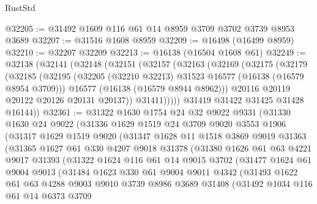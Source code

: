 \begin{lexlean}{RustStd}
\begin{coremodule}
@32205 := @31492 @1609 @116 @61 @14 @8959 @3709 @3702 @3739 @8953 @3689
@32207 := @31516 @1608 @8959
@32209 := @16498 (@16499 @8959)
@32210 := @32207 @32209
@32213 := @16138 (@16504 @1608 @61)
@32249 := @32138
    (@32141
      (@32148
        (@32151
          (@32157
            (@32163
              (@32169
                (@32175
                  (@32179
                    (@32185
                      (@32195
                        (@32205 (@32210 @32213) @31523 @16577 (@16138 (@16579 @8954 @3709)))
                        @16577
                        (@16138 (@16579 @8944 @8962)))
                      @20116
                      @20119
                      @20122
                      @20126
                      @20131
                      @20137))
                  @31411)))))
        @31419
        @31422
        @31425
        @31428
        @16144))
@32361 := @31322
    @1630
    @1754
    @24
    @32
    @9022
    @9331
    (@31330
      @1630
      @24
      @9022
      (@31336
        @1629
        @1519
        @24
        @3709
        @9020
        @3553
        @1906
        (@31317
          @1629
          @1519
          @9020
          (@31347
            @1628
            @11
            @1518
            @3869
            @9019
            @31363
            (@31365
              @1627
              @61
              @330
              @4207
              @9018
              @31378
              (@31380
                @1626
                @61
                @63
                @4221
                @9017
                @31393
                (@31322
                  @1624
                  @116
                  @61
                  @14
                  @9015
                  @3702
                  (@31477
                    @1624
                    @61
                    @9004
                    @9013
                    (@31484
                      @1623
                      @330
                      @61
                      @9004
                      @9011
                      @4342
                      (@31493
                        @1622
                        @61
                        @63
                        @4288
                        @9003
                        @9010
                        @3739
                        @8986
                        @3689
                        @31408
                        (@31492
                          @1034
                          @116
                          @61
                          @14
                          @6373
                          @3709

\end{coremodule}
\end{lexlean}
